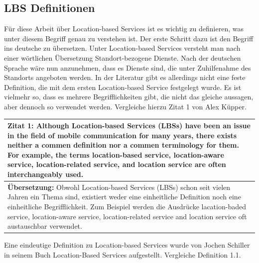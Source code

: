 \subsection{LBS Definitionen}





Für diese Arbeit über Location-based Services ist es wichtig zu definieren, was unter diesem Begriff genau zu verstehen ist. Der erste Schritt dazu ist den Begriff ins deutsche zu übersetzen. Unter Location-based Services versteht man nach einer wörtlichen Übersetzung Standort-bezogene Dienste. Nach der deutschen Sprache wäre nun anzunehmen, dass es Dienste sind, die unter Zuhilfenahme des Standorts angeboten werden. In der Literatur gibt es allerdings nicht eine feste Definition, die mit dem ersten Location-based Service festgelegt wurde. Es ist vielmehr so, dass es mehrere Begrifflichkeiten gibt, die nicht das gleiche aussagen, aber dennoch so verwendet werden. Vergleiche hierzu Zitat 1 von Alex Küpper.

\begin{table}[h]
	\centering
	\begin{tabular}{|p{16cm}|}\hline
		\textbf{Zitat 1:} \glqq Although Location-based Services (LBSs) have been an issue in the field of mobile communication for many years, there exists neither a commen definition nor a commen terminology for them. For example, the terms location-based service, location-aware service, location-related service, and location service are often interchangeably used. \cite[S.1]{Kuepper2005} \\ \hline
		\textbf{Übersetzung:} Obwohl Location-based Services (LBSs) schon seit vielen Jahren ein Thema sind, existiert weder eine einheitliche Definition noch eine einheitliche Begrifflichkeit. Zum Beispiel werden die Ausdrücke lacation-baded service, location-aware service, location-related service and location service oft austauschbar verwendet. \\ \hline
	\end{tabular}
\end{table}


Eine eindeutige Definition zu Location-based Services wurde von Jochen Schiller in seinem Buch \glqq Location-Based Services \grqq aufgestellt. Vergleiche Definition 1.1.


